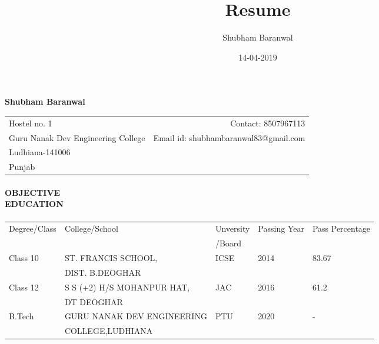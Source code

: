 \documentclass{article}
\title{Resume}
\date{14-04-2019}
\author{Shubham Baranwal}
\begin{document}
	\begin{center}
		\begin{Large}
			\textbf{Shubham Baranwal}
		\end{Large}
	\end{center}
	\hrulefill
	

	\begin{center} 
		\begin{tabular*}{\textwidth}{@{}l@{\extracolsep{\fill}}r@{}}
			Hostel no. 1  & Contact: 8507967113 \\
			Guru Nanak Dev Engineering College & Email id: shubhambaranwal83@gmail.com  \\
			Ludhiana-141006 &  \\
			Punjab & 
		\end{tabular*}
	\end{center}
		
			\begin{figure}[h!] 
				
				\hfill{}	
			\end{figure}
	\paragraph{\textbf{OBJECTIVE \\ EDUCATION}}
	\paragraph{}

	\begin{table}[h!]
		\begin{center}
			\begin{tabular}{|l|l|l|l|l|}
				\hline
				Degree/Class & College/School&Unversity& Passing Year & Pass Percentage\\
				&&/Board&&\\
				\hline
				Class 10& ST. FRANCIS SCHOOL, &ICSE&2014&83.67\\
				&DIST. B.DEOGHAR&&&\\
				\hline
				Class 12& S S (+2) H/S MOHANPUR HAT,&JAC&2016&61.2\\
				&DT DEOGHAR&&&\\
				\hline
				B.Tech&GURU NANAK DEV ENGINEERING& PTU&2020&-\\
				& COLLEGE,LUDHIANA&&&\\
				\hline
			\end{tabular}
		\end{center}
	\end{table}	
\end{document}
